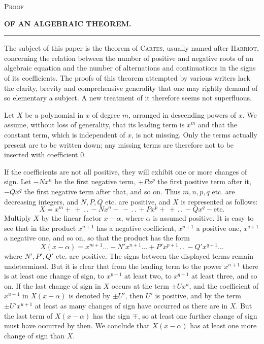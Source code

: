 \begin{center}
\textsc{Proof}\par\medskip
{\large\bfseries OF AN ALGEBRAIC THEOREM.}\par\medskip
\rule{0.28\linewidth}{0.4pt}
\end{center}
The subject of this paper is the theorem of \textsc{Cartes}, usually named after \textsc{Harriot}, concerning the relation between the number of positive and negative roots of an algebraic equation and the number of alternations and continuations in the signs of its coefficients. The proofs of this theorem attempted by various writers lack the clarity, brevity and comprehensive generality that one may rightly demand of so elementary a subject. A new treatment of it therefore seems not superfluous.

Let $X$ be a polynomial in $x$ of degree $m$, arranged in descending powers of $x$. We assume, without loss of generality, that its leading term is $x^m$ and that the constant term, which is independent of $x$, is not missing. Only the terms actually present are to be written down; any missing terms are therefore not to be inserted with coefficient $0$.

If the coefficients are not all positive, they will exhibit one or more changes of sign. Let $-Nx^n$ be the first negative term, $+Px^p$ the first positive term after it, $-Qx^q$ the first negative term after that, and so on. Thus $m,n,p,q$ etc. are decreasing integers, and $N,P,Q$ etc. are positive, and $X$ is represented as follows:
\[
X=x^m+\,+\, .\, .\,-Nx^n-\,-\, .\, .\,+Px^p+\,+\, .\, .\,-Qx^q-\text{etc.}
\]
Multiply $X$ by the linear factor $x-\alpha$, where $\alpha$ is assumed positive. It is easy to see that in the product $x^{n+1}$ has a negative coefficient, $x^{p+1}$ a positive one, $x^{q+1}$ a negative one, and so on, so that the product has the form
\[
X(x-\alpha)=x^{m+1}\ldots-N'x^{n+1}\ldots
+P'x^{p+1}\, .\, .\,-Q'x^{q+1}\ldots
\]
where $N',P',Q'$ etc. are positive. The signs between the displayed terms remain undetermined. But it is clear that from the leading term to the power $x^{n+1}$ there is at least one change of sign, to $x^{p+1}$ at least two, to $x^{q+1}$ at least three, and so on. If the last change of sign in $X$ occurs at the term $\pm Ux^u$, and the coefficient of $x^{u+1}$ in $X(x-\alpha)$ is denoted by $\pm U'$, then $U'$ is positive, and by the term $\pm U'x^{u+1}$ at least as many changes of sign have occurred as there are in $X$. But the last term of $X(x-\alpha)$ has the sign $\mp$, so at least one further change of sign must have occurred by then. We conclude that $X(x-\alpha)$ has at least one more change of sign than $X$.

